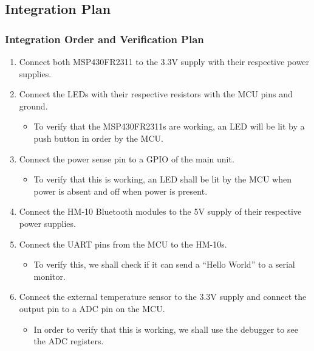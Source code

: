 \subsection{Integration Plan}
\subsubsection{Integration Order and Verification Plan}
\begin{enumerate}
  \item Connect both MSP430FR2311 to the 3.3\si{\V} supply with their respective power supplies.
  \item Connect the LEDs with their respective resistors with the MCU pins and ground.
        \begin{itemize}
         \item To verify that the MSP430FR2311s are working, an LED will be lit by a push button in order by the MCU.
        \end{itemize}
  \item Connect the power sense pin to a GPIO of the main unit.
        \begin{itemize}
         \item  To verify that this is working, an LED shall be lit by the MCU when power is absent and off when power is present.
        \end{itemize}
  \item Connect the HM-10 Bluetooth modules to the 5\si{\V} supply of their respective power supplies.
  \item Connect the UART pins from the MCU to the HM-10s.
        \begin{itemize}
         \item To verify this, we shall check if it can send a ``Hello World'' to a serial monitor.
        \end{itemize}
  \item Connect the external temperature sensor to the 3.3\si{\V} supply and connect the output pin to a ADC pin on the MCU.
        \begin{itemize}
         \item In order to verify that this is working, we shall use the debugger to see the ADC registers.
        \end{itemize}
\end{enumerate}
